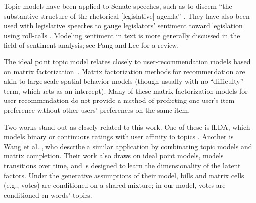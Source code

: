 \nocite{johnson:1999ch6}

Topic models have been applied to Senate speeches, such as to discern
``the substantive structure of the rhetorical [legislative] agenda''
\cite{quinn:2006}.  They have also been used with legislative speeches
to gauge legislators' sentiment toward legislation using roll-calls
\cite{thomas:2006}.  Modeling sentiment in text is more generally
discussed in the field of sentiment analysis; see Pang and Lee
\cite{pang:2008} for a review.


The ideal point topic model relates closely to user-recommendation
models based on matrix factorization~\cite{Salakhutdinov:2008a}.
Matrix factorization methods for recommendation are akin to
large-scale spatial behavior models (though usually with no
``difficulty'' term, which acts as an intercept).  Many of these
matrix factorization models for user recommendation do not provide a
method of predicting one user's item preference without other users'
preferences on the same item.

Two works stand out as closely related to this work.  One of these is
fLDA, which models binary or continuous ratings with user affinity to
topics \cite{agarwal:2010}.  Another is Wang et
al. \cite{wang:2010}, who describe a similar application by
combinating topic models and matrix completion.  Their work also draws
on ideal point models, models transitions over time, and is designed
to learn the dimensionality of the latent factors.  Under the
generative assumptions of their model, bills and matrix cells (e.g.,
votes) are conditioned on a shared mixture; in our model, votes are
conditioned on words' topics.






